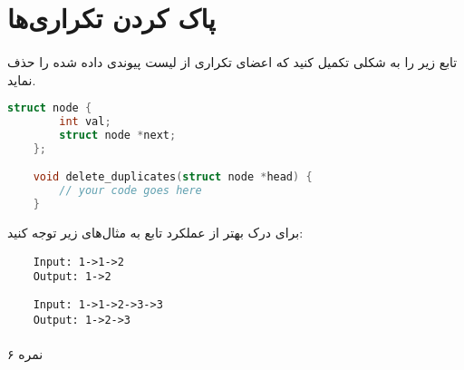 \documentclass[../main.tex]{subfiles}
\begin{document}
\section{پاک کردن تکراری‌ها}
\paragraph{}
تابع زیر را به شکلی تکمیل کنید که اعضای تکراری از لیست پیوندی داده شده را حذف نماید.

\begin{latin}
\begin{lstlisting}[language=c]
    struct node {
        int val;
        struct node *next;
    };

    void delete_duplicates(struct node *head) {
        // your code goes here
    }
\end{lstlisting}
\end{latin}

برای درک بهتر از عملکرد تابع به مثال‌های زیر توجه کنید:

\begin{latin}
\begin{verbatim}
    Input: 1->1->2
    Output: 1->2
\end{verbatim}

\begin{verbatim}
    Input: 1->1->2->3->3
    Output: 1->2->3
\end{verbatim}
\end{latin}

\paragraph{}
۶ نمره
\end{document}
